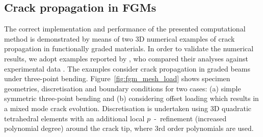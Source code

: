 \documentclass[onecolumn]{svjour3}
\begin{document}
\subsection{Crack propagation in FGMs} \label{sec:crack_propagation_FGM} 
% 
The correct implementation and performance of the presented computational method is demonstrated by means of two 3D numerical examples of crack propagation in functionally graded materials. In order to validate the numerical results, we adopt examples reported by \cite{kim2004simulation}, who compared their analyses against experimental data \cite{galvez1996crack, rousseau2000compositionally}. The examples consider crack propagation in graded beams under three-point bending. Figure~\ref{fig:fgm_mesh_load} shows specimen geometries, discretisation and boundary conditions for two cases: (a) simple symmetric three-point bending and (b) considering offset loading which results in a mixed mode crack evolution. Discretisation is undertaken using 3D quadratic tetrahedral elements with an additional local $p$~-~refinement (increased polynomial degree) around the crack tip, where 3rd order polynomials are used. 
\end{document}
